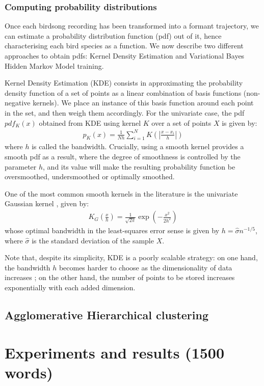 \documentclass[pdftex,11pt,a4paper]{article}
\theoremstyle{definition}
\theoremstyle{remark}
\begin{document}
\subsubsection{Computing probability distributions}
Once each birdsong recording has been transformed into a formant trajectory, we can estimate a probability distribution function (pdf) out of it, hence characterising each bird species as a function. We now describe two different approaches to obtain pdfs: Kernel Density Estimation and Variational Bayes Hidden Markov Model training.
\par Kernel Density Estimation (KDE) consists in approximating the probability density function of a set of points as a linear combination of basis functions (non-negative kernels). We place an instance of this basis function around each point in the set, and then weigh them accordingly. For the univariate case, the pdf $pdf_K(x)$ obtained from KDE using kernel $K$ over a set of points $X$ is given by:
\begin{align*}
p_K(x) = \frac{1}{Nh}\sum_{i=1}^NK\left(\left|\frac{x - x_i}{h}\right|\right)
\end{align*}
where $h$ is called the bandwidth. Crucially, using a smooth kernel provides a smooth pdf as a result, where the degree of smoothness is controlled by the parameter $h$, and its value will make the resulting probability function be oversmoothed, undersmoothed or optimally smoothed.
\par One of the most common smooth kernels in the literature is the univariate Gaussian kernel \cite{hastie2008}, given by:
\begin{align*}
K_G\left(\frac{x}{h}\right) = \frac{1}{\sqrt{2\pi}}\exp{\left(-\frac{x^2}{2h^2}\right)}
\end{align*}
whose optimal bandwidth in the least-squares error sense is given by $h = \hat{\sigma}n^{-1/5}$, where $\hat{\sigma}$ is the standard deviation of the sample $X$.
\par Note that, despite its simplicity, KDE is a poorly scalable strategy: on one hand, the bandwidth $h$ becomes harder to choose as the dimensionality of data increases \cite{Hansen2009}; on the other hand, the number of points to be stored increases exponentially with each added dimension.
\subsection{Agglomerative Hierarchical clustering}

\section{Experiments and results (1500 words)}
\label{section_results}
\end{document}
